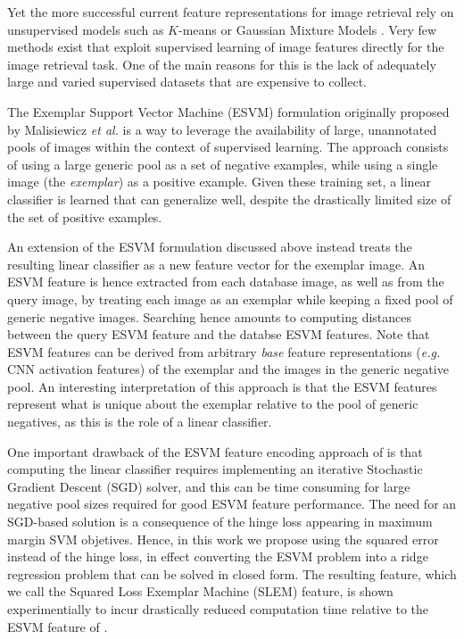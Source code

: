 Yet the more successful current feature representations for image retrieval rely on unsupervised models such as $K$-means \cite{Delhumeau2013} or Gaussian Mixture Models \cite{Perronnin2010}. Very few methods \cite{Arandjelovic15,Rana,Bilen2015} exist that exploit supervised learning of image features directly for the image retrieval task. One of the main reasons for this is the lack of adequately large and varied supervised datasets that are expensive to collect.

The Exemplar Support Vector Machine (ESVM) formulation originally proposed by Malisiewicz {\it et al.} \cite{Malisiewicza} is a way to leverage the availability of large, unannotated pools of images within the context of supervised learning. The approach consists of using a large generic pool as a set of negative examples, while using a single image (the \emph{exemplar}) as a positive example. Given these training set, a linear classifier is learned that can  generalize well, despite the drastically limited size of the set of positive examples. 

An extension \cite{ZePe15} of the ESVM formulation discussed above instead treats the resulting linear classifier as a new feature vector for the exemplar image. %
An ESVM feature is hence extracted from each database image, as well as from the query image, by treating each image as an exemplar while keeping a fixed pool of generic negative images. Searching hence amounts to computing distances between the query ESVM feature and the databse ESVM features. Note that ESVM features can be derived from arbitrary \emph{base} feature representations ({\it e.g.} CNN activation features) of the exemplar and the images in the generic negative pool. An interesting interpretation of this approach is that the ESVM features represent what is unique about the exemplar relative to the pool of generic negatives, as this is the role of a linear classifier.

One important drawback of the ESVM feature encoding approach of \cite{ZePe15} is that computing the linear classifier requires implementing an iterative Stochastic Gradient Descent (SGD) solver, and this can be time consuming for large negative pool sizes required for good ESVM feature performance. The need for an SGD-based solution is a consequence of the hinge loss appearing in maximum margin SVM objetives. Hence, in this work we  propose using the squared error instead of the hinge loss, in effect converting the ESVM problem into a ridge regression problem that can be solved in closed form. The resulting feature, which we call the Squared Loss Exemplar Machine (SLEM) feature, is shown experimentially to incur drastically reduced computation time relative to the ESVM feature of \cite{ZePe15}. 

